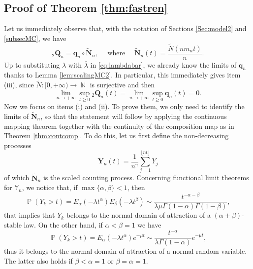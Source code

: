 \documentclass[]{amsart}
\numberwithin{equation}{section}
\theoremstyle{remark}
\theoremstyle{definition}
\DeclareMathOperator{\N}{\mathbb{N}}
\DeclareMathOperator{\bP}{\mathbb{P}}
\begin{document}
\subsection{Proof of Theorem \ref{thm:fastren}}
Let us immediately observe that, with the notation of Sections \ref{Sec:model2} and \ref{subsecMC}, we have
\begin{equation*}
	{}_2\mathbf{Q}_n=\mathbf{q}_n \circ \widetilde{\mathbf{N}}_n, \quad \mbox{ where } \quad \widetilde{\mathbf{N}}_n(t)=\frac{\widetilde{N}(nm_nt)}{n}. 
\end{equation*}
Up to substituting $\lambda$ with $\overline{\lambda}$ in \eqref{eq:lambdabar}, we already know the limits of $\mathbf{q}_n$ thanks to Lemma \ref{lem:scalingMC2}. In particular, this immediately gives item (iii), since $\widetilde{N}:[0,+\infty) \to \N$ is surjective and then
\begin{equation*}
	\lim_{n \to +\infty}\sup_{t \ge 0}{}_2\mathbf{Q}_n(t)=\lim_{n \to +\infty}\sup_{t \ge 0}\mathbf{q}_n(t)=0.
\end{equation*}
Now we focus on items (i) and (ii). To prove them, we only need to identify the limits of $\widetilde{\mathbf{N}}_n$, so that the statement will follow by applying the continuous mapping theorem together with the continuity of the composition map as in Theorem \ref{thm:contcomp}. To do this, let us first define the non-decreasing processes
\begin{equation*}
	\mathbf{Y}_n(t)=\frac{1}{n^\gamma}\sum_{j=1}^{\lfloor nt \rfloor}Y_j
\end{equation*}
of which $\widetilde{\mathbf{N}}_n$ is the scaled counting process. Concerning functional limit theorems for $\mathbb{Y}_n$, we notice that, if $\max\{\alpha,\beta\}<1$, then
\begin{equation}\label{eq:asymptotic}
	\bP(Y_k>t)=E_\alpha(-\lambda t^\alpha)E_\beta(-\lambda t^\beta) \sim \frac{t^{-\alpha-\beta}}{\lambda \mu \Gamma(1-\alpha)\Gamma(1-\beta)},
\end{equation}
that implies that $Y_k$ belongs to the normal domain of attraction of a $(\alpha+\beta)$-stable law. On the other hand, if $\alpha<\beta=1$ we have
\begin{equation*}
	\bP(Y_k>t)=E_\alpha(-\lambda t^\alpha)e^{-\mu t} \sim \frac{t^{-\alpha}}{\lambda\Gamma(1-\alpha)}e^{-\mu t},
\end{equation*}
thus it belongs to the normal domain of attraction of a normal random variable. The latter also holds if $\beta<\alpha=1$ or $\beta=\alpha=1$.
\end{document}
